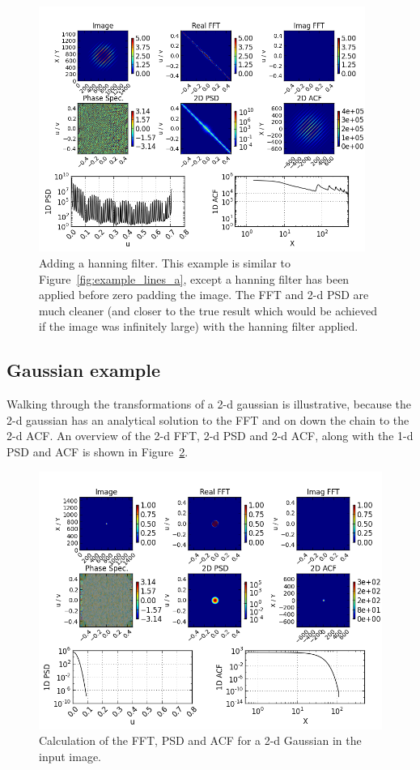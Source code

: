 \documentclass[11pt,preprint]{aastex}
\begin{document}
\begin{figure}[htbp]
\centering
\includegraphics[width=4.2in]{example_lines_b}
\caption{{\small
Adding a hanning filter. This example is similar to Figure~\ref{fig:example_lines_a}, except a hanning filter has been applied before zero padding the image. The FFT and 2-d PSD are much cleaner (and closer to the true result which would be achieved if the image was infinitely large) with the hanning filter applied. }}
 \label{fig:example_lines_b}
\end{figure}


\subsection{Gaussian example}

Walking through the transformations of a 2-d gaussian is illustrative, because the 2-d gaussian has an analytical solution to the FFT and on down the chain to the 2-d ACF.  An overview of the 2-d FFT, 2-d PSD and 2-d ACF, along with the 1-d PSD and ACF is shown in Figure~\ref{fig:gauss_all}. 

\begin{figure}[htbp]
\centering
\includegraphics[width=5in]{gauss_all}
\caption{{\small
Calculation of the FFT, PSD and ACF for a 2-d Gaussian in the input image. }}
\label{fig:gauss_all}
\end{figure}
\end{document}
